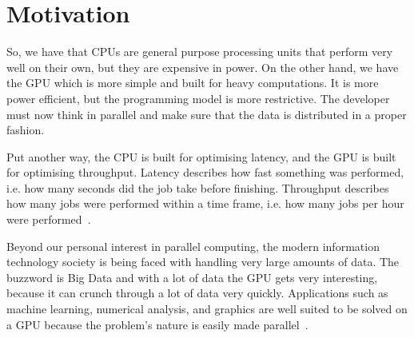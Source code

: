 \section{Motivation}
\label{sec:motivation}

So, we have that CPUs are general purpose processing units that perform very well on their own, but they are expensive in power.
On the other hand, we have the GPU which is more simple and built for heavy computations.
It is more power efficient, but the programming model is more restrictive.
The developer must now think in parallel and make sure that the data is distributed in a proper fashion.

Put another way, the CPU is built for optimising latency, and the GPU is built for optimising throughput.
Latency describes how fast something was performed, i.e. how many seconds did the job take before finishing.
Throughput describes how many jobs were performed within a time frame, i.e. how many jobs per hour were performed~\cite{farber2011cuda}.

Beyond our personal interest in parallel computing, the modern information technology society is being faced with handling very large amounts of data.
The buzzword is Big Data and with a lot of data the GPU gets very interesting, because it can crunch through a lot of data very quickly.
Applications such as machine learning, numerical analysis, and graphics are well suited to be solved on a GPU because the problem's nature is easily made parallel~\cite{amdahlorgustafson2011,chen2014data}.
